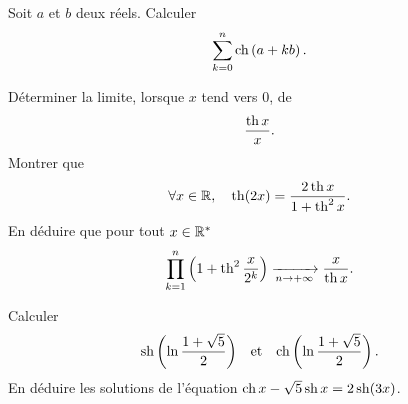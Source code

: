 \documentclass{magnolia}
\begin{document}
Soit $a$ et $b$ deux réels. Calculer
$$\sum_{k=0}^n \operatorname{ch}\left(a+kb\right).$$


\begin{questions}
\question Déterminer la limite, lorsque $x$ tend vers 0, de
  \[\frac{\operatorname{th} x}{x}.\]
\question Montrer que
  \[\forall x\in\mathbb{R},\quad \operatorname{th}(2x)=\frac{2\operatorname{th} x}{1+\operatorname{th}^2 x}.\]
\question En déduire que pour tout $x\in{\mathbb{R}^*}$
  \[\prod_{k=1}^n \left(1+\operatorname{th}^2 \frac{x}{2^k}\right)\xrightarrow[n\rightarrow +\infty]{}\frac{x}{\operatorname{th} x}.\]
\end{questions}

\begin{questions}
\question Calculer
  \[\operatorname{sh}\left(\ln\frac{1+\sqrt{5}}{2}\right) \quad\!\text{et}\quad\! 
    \operatorname{ch}\left(\ln\frac{1+\sqrt{5}}{2}\right).\]
\question
  En déduire les solutions de l'équation $\operatorname{ch} x-\sqrt{5}\operatorname{sh} x=2\operatorname{sh}(3x)$.
\end{questions}
\end{document}
